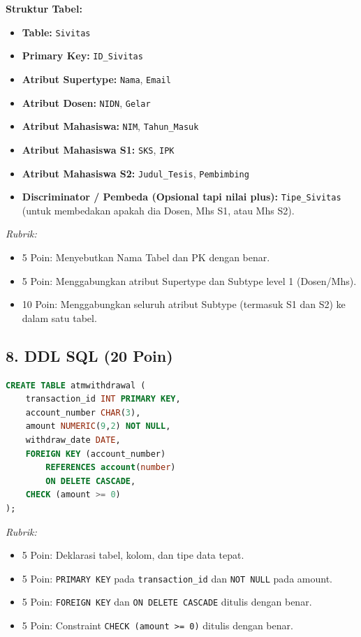\documentclass[11pt,a4paper]{article}
\begin{document}
\textbf{Struktur Tabel:}
\begin{itemize}
	\item \textbf{Table:} \texttt{Sivitas}
	\item \textbf{Primary Key:} \texttt{ID\_Sivitas}
	\item \textbf{Atribut Supertype:} \texttt{Nama}, \texttt{Email}
	\item \textbf{Atribut Dosen:} \texttt{NIDN}, \texttt{Gelar}
	\item \textbf{Atribut Mahasiswa:} \texttt{NIM}, \texttt{Tahun\_Masuk}
	\item \textbf{Atribut Mahasiswa S1:} \texttt{SKS}, \texttt{IPK}
	\item \textbf{Atribut Mahasiswa S2:} \texttt{Judul\_Tesis}, \texttt{Pembimbing}
	\item \textbf{Discriminator / Pembeda (Opsional tapi nilai plus):} \texttt{Tipe\_Sivitas} (untuk membedakan apakah dia Dosen, Mhs S1, atau Mhs S2).
\end{itemize}
\textit{Rubrik:}
\begin{itemize}
	\item 5 Poin: Menyebutkan Nama Tabel dan PK dengan benar.
	\item 5 Poin: Menggabungkan atribut Supertype dan Subtype level 1 (Dosen/Mhs).
	\item 10 Poin: Menggabungkan seluruh atribut Subtype (termasuk S1 dan S2) ke dalam satu tabel.
\end{itemize}

\subsection*{8. DDL SQL (20 Poin)}
\begin{lstlisting}[language=SQL]
CREATE TABLE atmwithdrawal (
    transaction_id INT PRIMARY KEY,
    account_number CHAR(3),
    amount NUMERIC(9,2) NOT NULL,
    withdraw_date DATE,
    FOREIGN KEY (account_number)
        REFERENCES account(number)
        ON DELETE CASCADE,
    CHECK (amount >= 0)
);
\end{lstlisting}
\textit{Rubrik:}
\begin{itemize}
	\item 5 Poin: Deklarasi tabel, kolom, dan tipe data tepat.
	\item 5 Poin: \texttt{PRIMARY KEY} pada \texttt{transaction\_id} dan \texttt{NOT NULL} pada amount.
	\item 5 Poin: \texttt{FOREIGN KEY} dan \texttt{ON DELETE CASCADE} ditulis dengan benar.
	\item 5 Poin: Constraint \texttt{CHECK (amount >= 0)} ditulis dengan benar.
\end{itemize}
\end{document}
